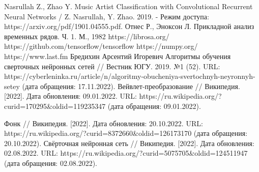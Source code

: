 \begin{thebibliography}{99}
 Nasrullah Z., Zhao Y. Music Artist Classification with Convolutional Recurrent Neural Networks / Z. Nasrullah, Y. Zhao. 2019. - Режим доступа: https://arxiv.org/pdf/1901.04555.pdf.
 Отнес Р., Эноксон Л. Прикладной анализ временных рядов. Ч. 1. М., 1982
 https://librosa.org/
 https://github.com/tensorflow/tensorflow
 https://numpy.org/
 https://www.last.fm
 Бредихин Арсентий Игоревич Алгоритмы обучения сверточных нейронных сетей // Вестник ЮГУ. 2019. №1 (52). URL: https://cyberleninka.ru/article/n/algoritmy-obucheniya-svertochnyh-neyronnyh-setey (дата обращения: 17.11.2022).
 Вейвлет-преобразование // Википедия. [2022]. Дата обновления: 09.01.2022. URL: https://ru.wikipedia.org/?curid=170295\&oldid=119235347 (дата обращения: 09.01.2022). 

 Фонк // Википедия. [2022]. Дата обновления: 20.10.2022. URL: https://ru.wikipedia.org/?curid=8372660\&oldid=126173170 (дата обращения: 20.10.2022). 
 Свёрточная нейронная сеть // Википедия. [2022]. Дата обновления: 02.08.2022. URL: https://ru.wikipedia.org/?curid=5075705\&oldid=124511947 (дата обращения: 02.08.2022). 
\end{thebibliography}
